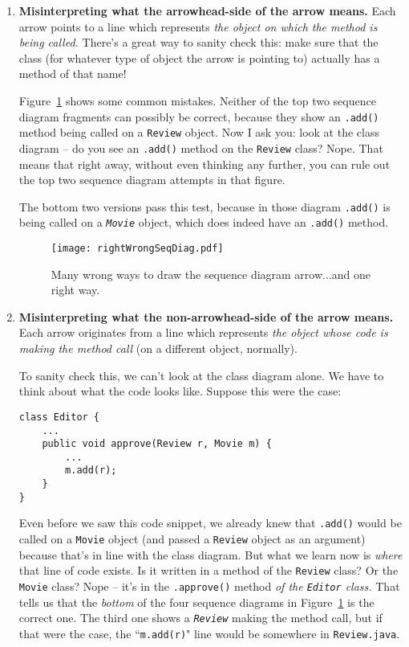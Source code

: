\begin{enumerate}
\itemsep.1em
\item \textbf{Misinterpreting what the arrowhead-side of the arrow means.}
Each arrow points to a line which represents \textit{the object on which the
method is being called.} There's a great way to sanity check this: make sure
that the class (for whatever type of object the arrow is pointing to) actually
has a method of that name!

Figure~\ref{fig:rightWrongSeqDiag} shows some common mistakes. Neither of the
top two sequence diagram fragments can possibly be correct, because they show
an \texttt{.add()} method being called on a \texttt{Review} object. Now I ask
you: look at the class diagram -- do you see an \texttt{.add()} method on the
\texttt{Review} class? Nope. That means that right away, without even thinking
any further, you can rule out the top two sequence diagram attempts in that
figure.

The bottom two versions pass this test, because in those diagram
\texttt{.add()} is being called on a \textit{\texttt{Movie}} object, which
does indeed have an \texttt{.add()} method.

\begin{figure}
\centering
\texttt{[image: rightWrongSeqDiag.pdf]}  %
\caption{Many wrong ways to draw the sequence diagram arrow...and one right
way.}
\label{fig:rightWrongSeqDiag}
\end{figure}

\item \textbf{Misinterpreting what the non-arrowhead-side of the arrow means.}
Each arrow originates from a line which represents \textit{the object whose
code is making the method call} (on a different object, normally). 

To sanity check this, we can't look at the class diagram alone. We have to
think about what the code looks like. Suppose this were the case:

\begin{Verbatim}[fontsize=\small,samepage=true,frame=single]
class Editor {
    ...
    public void approve(Review r, Movie m) {
        ...
        m.add(r);
    }
}
\end{Verbatim}

Even before we saw this code snippet, we already knew that \texttt{.add()}
would be called on a \texttt{Movie} object (and passed a \texttt{Review}
object as an argument) because that's in line with the class diagram. But what
we learn now is \textit{where} that line of code exists. Is it written in a
method of the \texttt{Review} class? Or the \texttt{Movie} class? Nope -- it's
in the \texttt{.approve()} method \textit{of the \texttt{Editor} class.} That
tells us that the \textit{bottom} of the four sequence diagrams in
Figure~\ref{fig:rightWrongSeqDiag} is the correct one. The third one shows a
\textit{\texttt{Review}} making the method call, but if that were the case,
the ``\texttt{m.add(r)}" line would be somewhere in \texttt{Review.java}.

\end{enumerate}

